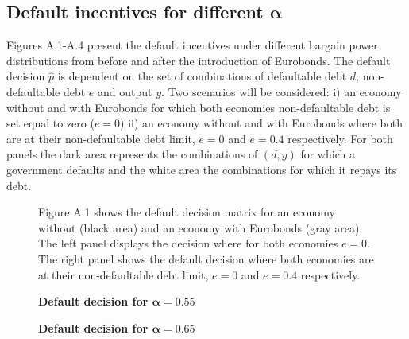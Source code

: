 \begin{appendices}
\chapter{Default incentives for different $\bm{\alpha}$}

Figures A.1-A.4 present the default incentives under different bargain power distributions from before and after the introduction of Eurobonds. The default decision $\hat{p}$ is dependent on the set of combinations of defaultable debt $d$, non-defaultable debt $e$ and output $y$. Two scenarios will be considered: i) an economy without and with Eurobonds for which both economies non-defaultable debt is set equal to zero ($e = 0$) ii) an economy without and with Eurobonds where both are at their non-defaultable debt limit, $e = 0$ and $e = 0.4$ respectively. For both panels the dark area represents the combinations of $(d,y)$ for which a government defaults and the white area the combinations for which it repays its debt.
\begin{figure}[H]
\caption{\textbf{Default decision for $\bm{\alpha = 0.55}$}}
    \centering
    \vspace{1mm}
        \begin{tablenotes}
      \footnotesize
    Figure A.1 shows the default decision matrix for an economy without (black area) and an economy with Eurobonds (gray area). The left panel displays the decision where for both economies $e = 0$. The right panel shows the default decision where both economies are at their non-defaultable debt limit, $e = 0$ and $e = 0.4$ respectively.
    \end{tablenotes}
\end{figure}
\vspace{11mm} 
\begin{figure}[H]
\caption{\textbf{Default decision for $\bm{\alpha = 0.65}$}}
    \centering
    \vspace{1mm}
\end{figure}
\end{appendices}
